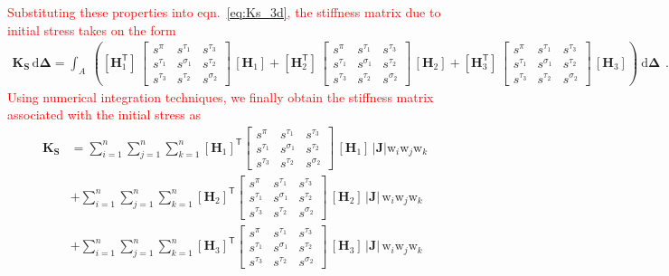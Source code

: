 \textcolor{red}{Substituting these properties into eqn.~\eqref{eq:Ks_3d}, the stiffness matrix due to initial stress takes on the form}
\begin{equation}
\begin{aligned}
{\mathbf{K_{\mathbf{S}}}}\,\mathrm{d}\boldsymbol{\Delta}=\int_A \:\left([\mathbf{H}^\mathsf{T}_1]\,\begin{bmatrix}s^{\pi} & s^{\tau_1} & s^{\tau_3}\\ 
s^{\tau_1} & s^{\sigma_1} & s^{\tau_2} \\ 
s^{\tau_3} & s^{\tau_2} & s^{\sigma_2} \end{bmatrix} \, [\mathbf{H}_1]+ 
[\mathbf{H}^\mathsf{T}_2]\,\begin{bmatrix}s^{\pi} & s^{\tau_1} & s^{\tau_3}\\ 
s^{\tau_1} & s^{\sigma_1} & s^{\tau_2} \\ 
s^{\tau_3} & s^{\tau_2} & s^{\sigma_2} \end{bmatrix} \, [\mathbf{H}_2]+
[\mathbf{H}^\mathsf{T}_3]\,\begin{bmatrix}s^{\pi} & s^{\tau_1} & s^{\tau_3}\\ 
s^{\tau_1} & s^{\sigma_1} & s^{\tau_2} \\ 
s^{\tau_3} & s^{\tau_2} & s^{\sigma_2} \end{bmatrix} \, [\mathbf{H}_3]\right)\:\mathrm{d}\boldsymbol{\Delta}
\end{aligned}.
\end{equation}
\textcolor{red}{Using numerical integration techniques, we finally obtain the stiffness matrix associated with the initial stress as} 
\begin{equation}
\begin{aligned}
\mathbf{K_{\mathbf{S}}} & = \sum_{i=1}^{n}  \sum_{j=1}^{n}  \sum_{k=1}^{n} [\mathbf{H}_1]^{\mathsf{T}}  \begin{bmatrix} s^{\pi} & s^{\tau_1} & s^{\tau_3}\\ 
s^{\tau_1} & s^{\sigma_1} & s^{\tau_2} \\ 
s^{\tau_3} & s^{\tau_2} & s^{\sigma_2}
\end{bmatrix} \, [\mathbf{H}_1] \, |\mathbf{J}|  \mathrm{w}_i \mathrm{w}_j \mathrm{w}_k \\
& + \sum_{i=1}^{n}  \sum_{j=1}^{n}  \sum_{k=1}^{n} [\mathbf{H}_2]^{\mathsf{T}}  \begin{bmatrix} s^{\pi} & s^{\tau_1} & s^{\tau_3}\\ 
s^{\tau_1} & s^{\sigma_1} & s^{\tau_2} \\ 
s^{\tau_3} & s^{\tau_2} & s^{\sigma_2}
\end{bmatrix} \, [\mathbf{H}_2] \, |\mathbf{J}|  \, \mathrm{w}_i \mathrm{w}_j \mathrm{w}_k \\
& + \sum_{i=1}^{n}  \sum_{j=1}^{n}  \sum_{k=1}^{n} [\mathbf{H}_3]^{\mathsf{T}}  \begin{bmatrix} s^{\pi} & s^{\tau_1} & s^{\tau_3}\\ 
s^{\tau_1} & s^{\sigma_1} & s^{\tau_2} \\ 
s^{\tau_3} & s^{\tau_2} & s^{\sigma_2}
\end{bmatrix} \, [\mathbf{H}_3] \, |\mathbf{J}|  \, \mathrm{w}_i \mathrm{w}_j \mathrm{w}_k
\end{aligned}
\end{equation}
